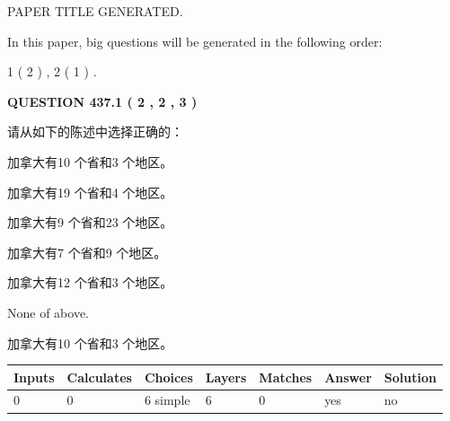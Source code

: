 \documentclass{ctexart}
\begin{document}
   
\vspace{0.2in}
   
   
   
   
   
   
   
   
 \vspace{0.2in}
 
 
 
 
   
   
 PAPER TITLE GENERATED.
   
   
   
\vspace{0.2in}
   
In this paper, big questions will be generated in the following order: 
   
   
   1 ( 2 )
 ,
   2 ( 1 )
 .
  
\vspace{0.2in}
  
{\textbf{\Large{QUESTION
437.1 
 ( 2 , 2 , 3 )
}}}
  
  
请从如下的陈述中选择正确的：
 
 
加拿大有10 个省和3 个地区。
 
 
加拿大有19 个省和4 个地区。
 
 
加拿大有9 个省和23 个地区。
 
 
加拿大有7 个省和9 个地区。
 
 
加拿大有12 个省和3 个地区。
 
 
 None of above.
 
 
\noindent{}
 
 
加拿大有10 个省和3 个地区。
 
 
\noindent{}
 
 
   
   
   
   
\noindent\begin{tabular}{|l|l|l|l|l|l|l|}
 \hline
Inputs & Calculates & Choices & Layers & Matches & Answer & Solution \\ \hline
 0  & 
 0  & 
 6
  simple  
  & 
 6  & 
 0  & 
  yes & 
  no 
  \\ \hline
 \end{tabular}
   
\end{document}
